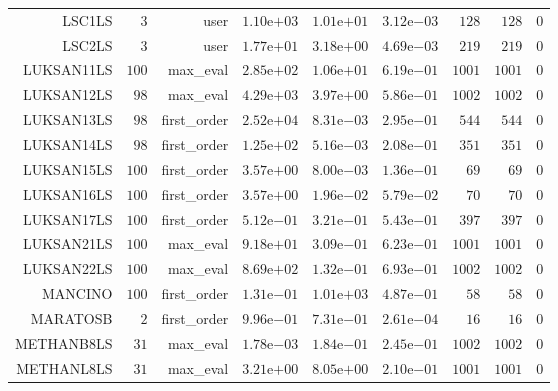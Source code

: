 \begin{longtable}{rrrrrrrrr}
LSC1LS & \(     3\) & user & \( 1.10\)e\(+03\) & \( 1.01\)e\(+01\) & \( 3.12\)e\(-03\) & \(   128\) & \(   128\) & \(     0\) \\
LSC2LS & \(     3\) & user & \( 1.77\)e\(+01\) & \( 3.18\)e\(+00\) & \( 4.69\)e\(-03\) & \(   219\) & \(   219\) & \(     0\) \\
LUKSAN11LS & \(   100\) & max\_eval & \( 2.85\)e\(+02\) & \( 1.06\)e\(+01\) & \( 6.19\)e\(-01\) & \(  1001\) & \(  1001\) & \(     0\) \\
LUKSAN12LS & \(    98\) & max\_eval & \( 4.29\)e\(+03\) & \( 3.97\)e\(+00\) & \( 5.86\)e\(-01\) & \(  1002\) & \(  1002\) & \(     0\) \\
LUKSAN13LS & \(    98\) & first\_order & \( 2.52\)e\(+04\) & \( 8.31\)e\(-03\) & \( 2.95\)e\(-01\) & \(   544\) & \(   544\) & \(     0\) \\
LUKSAN14LS & \(    98\) & first\_order & \( 1.25\)e\(+02\) & \( 5.16\)e\(-03\) & \( 2.08\)e\(-01\) & \(   351\) & \(   351\) & \(     0\) \\
LUKSAN15LS & \(   100\) & first\_order & \( 3.57\)e\(+00\) & \( 8.00\)e\(-03\) & \( 1.36\)e\(-01\) & \(    69\) & \(    69\) & \(     0\) \\
LUKSAN16LS & \(   100\) & first\_order & \( 3.57\)e\(+00\) & \( 1.96\)e\(-02\) & \( 5.79\)e\(-02\) & \(    70\) & \(    70\) & \(     0\) \\
LUKSAN17LS & \(   100\) & first\_order & \( 5.12\)e\(-01\) & \( 3.21\)e\(-01\) & \( 5.43\)e\(-01\) & \(   397\) & \(   397\) & \(     0\) \\
LUKSAN21LS & \(   100\) & max\_eval & \( 9.18\)e\(+01\) & \( 3.09\)e\(-01\) & \( 6.23\)e\(-01\) & \(  1001\) & \(  1001\) & \(     0\) \\
LUKSAN22LS & \(   100\) & max\_eval & \( 8.69\)e\(+02\) & \( 1.32\)e\(-01\) & \( 6.93\)e\(-01\) & \(  1002\) & \(  1002\) & \(     0\) \\
MANCINO & \(   100\) & first\_order & \( 1.31\)e\(-01\) & \( 1.01\)e\(+03\) & \( 4.87\)e\(-01\) & \(    58\) & \(    58\) & \(     0\) \\
MARATOSB & \(     2\) & first\_order & \( 9.96\)e\(-01\) & \( 7.31\)e\(-01\) & \( 2.61\)e\(-04\) & \(    16\) & \(    16\) & \(     0\) \\
METHANB8LS & \(    31\) & max\_eval & \( 1.78\)e\(-03\) & \( 1.84\)e\(-01\) & \( 2.45\)e\(-01\) & \(  1002\) & \(  1002\) & \(     0\) \\
METHANL8LS & \(    31\) & max\_eval & \( 3.21\)e\(+00\) & \( 8.05\)e\(+00\) & \( 2.10\)e\(-01\) & \(  1001\) & \(  1001\) & \(     0\) \\

\end{longtable}
